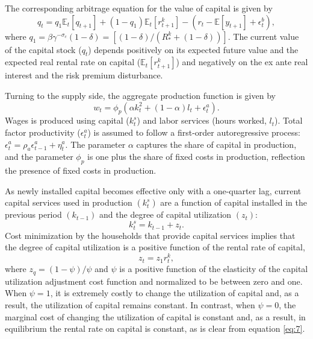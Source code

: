 \documentclass[11pt]{article}
\newcommand{\E}{\mathbb{E}}
\newcommand{\yobs}[1]{w_{#1}}
\newcommand{\lobs}[1]{l_{#1}}
\newcommand{\robs}[1]{r_{#1}}
\newcommand{\piobs}[1]{y_{#1}}
\newcommand{\Output}{Wages}
\newcommand{\hours}{hours worked}
\newcommand{\realinterest}{real interest}
\newcommand{\labor}{labor}
\begin{document}
The corresponding arbitrage equation for the value of capital is given
by \begin{equation}
q_t = q_1\E_t[q_{t+1}] + (1-q_1)\E_t[r_{t+1}^k] - (\robs{t} -
\E[\piobs{t+1}] + \epsilon_t^b),
\end{equation} where
\(q_1 = \beta\gamma^{-\sigma_c}(1-\delta) = [(1-\delta)/(R_*^k + (1-\delta))]\).
The current value of the capital stock (\(q_t\)) depends positively on
its expected future value and the expected real rental rate on capital
(\(\E_t[r_{t+1}^k]\)) and negatively on the ex ante \realinterest{} and
the risk premium disturbance.

Turning to the supply side, the aggregate production function is given
by \begin{equation}
  \yobs{t} = \phi_p(\alpha k_t^2 + (1-\alpha)\lobs{t} + \epsilon_t^a).
\end{equation} \Output{} is produced using capital (\(k_t^s\)) and
\labor{} services (\hours, \(\lobs{t}\)). Total factor productivity
(\(\epsilon_t^a\)) is assumed to follow a first-order autoregressive
process: \(\epsilon_t^a = \rho_a \epsilon_{t-1}^a + \eta_t^a\). The
parameter \(\alpha\) captures the share of capital in production, and
the parameter \(\phi_p\) is one plus the share of fixed costs in
production, reflection the presence of fixed costs in production.

As newly installed capital becomes effective only with a one-quarter
lag, current capital services used in production \((k_t^s)\) are a
function of capital installed in the previous period \((k_{t-1})\) and
the degree of capital utilization \((z_t)\): \begin{equation}
  k_t^s = k_{t-1} + z_t.
\end{equation} Cost minimization by the households that provide capital
services implies that the degree of capital utilization is a positive
function of the rental rate of capital, \begin{equation}
  \label{eq:7}
  z_t = z_1 r_t^k,
\end{equation} where \(z_q = (1-\psi)/\psi\) and \(\psi\) is a positive
function of the elasticity of the capital utilization adjustment cost
function and normalized to be between zero and one. When \(\psi=1\), it
is extremely costly to change the utilization of capital and, as a
result, the utilization of capital remains constant. In contrast, when
\(\psi=0\), the marginal cost of changing the utilization of capital is
constant and, as a result, in equilibrium the rental rate on capital is
constant, as is clear from equation \eqref{eq:7}.
\end{document}
